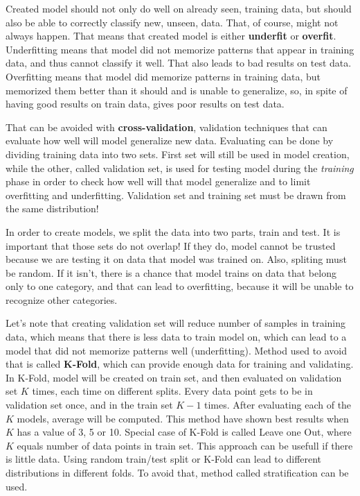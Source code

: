 \documentclass[a4paper]{article}
\begin{document}
Created model should not only do well on already seen, training data, but should also be able to correctly classify new, unseen, data. That, of course, might not always happen. That means that created model is either \textbf{underfit} or \textbf{overfit}. Underfitting means that model did not memorize patterns that appear in training data, and thus cannot classify it well. That also leads to bad results on test data. Overfitting means that model did memorize patterns in training data, but memorized them better than it should and is unable to generalize, so, in spite of having good results on train data, gives poor results on test data.

That can be avoided with \textbf{cross-validation}, validation techniques that can evaluate how well will model generalize new data. Evaluating can be done by dividing training data into two sets. First set will still be used in model creation, while the other, called validation set, is used for testing model during the \textit{training} phase in order to check how well will that model generalize and to limit overfitting and underfitting. Validation set and training set must be drawn from the same distribution! \cite{crossVal}

In order to create models, we split the data into two parts, train and test. It is important that those sets do not overlap! If they do, model cannot be trusted because we are testing it on data that model was trained on. Also, spliting must be random. If it isn't, there is a chance that model trains on data that belong only to one category, and that can lead to overfitting, because it will be unable to recognize other categories. \cite{crossVal}

Let's note that creating validation set will reduce number of samples in training data, which means that there is less data to train model on, which can lead to a model that did not memorize patterns well (underfitting). Method used to avoid that is called \textbf{K-Fold}, which can provide enough data for training and validating. In K-Fold, model will be created on train set, and then evaluated on validation set $K$ times, each time on different splits. Every data point gets to be in validation set once, and in the train set $K-1$ times. After evaluating each of the $K$ models, average will be computed. This method have shown best results when $K$ has a value of 3, 5 or 10. Special case of K-Fold is called Leave one Out, where $K$ equals number of data points in train set. This approach can be usefull if there is little data. Using random train/test split or K-Fold can lead to different distributions in different folds. To avoid that, method called stratification can be used. \cite{crossVal}
\end{document}
